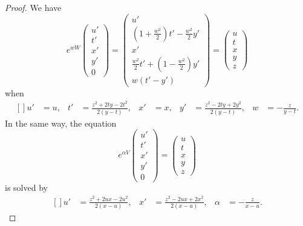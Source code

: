 \begin{proof}
We have
\begin{equation}
	 e^{wW}
\begin{pmatrix}
	u'	\\ 
	t'	\\ 
	x'	\\ 
	y'	\\ 
	0	
\end{pmatrix}=
\begin{pmatrix}
	u'	\\ 
	\left( 1+\frac{ w^2 }{2} \right)t'-\frac{ w^2 }{2}y'	\\ 
	x'	\\ 
	\frac{ w^2 }{2}t'+\left( 1-\frac{ w^2 }{2} \right)y'	\\ 
	w(t'-y')	
\end{pmatrix}
=
\begin{pmatrix}
	u	\\ 
	t	\\ 
	x	\\ 
	y	\\ 
	z	
\end{pmatrix}
\end{equation}
when
\begin{equation}
	\begin{aligned}[]
		u'&=u,& t'&=\frac{ z^2+2ty-2t^2 }{ 2(y-t) },&x'&=x,&y'&=\frac{ z^2-2ty+2y^2 }{ 2(y-t) },&w&=-\frac{ z }{ y-t }.
	\end{aligned}
\end{equation}
In the same way, the equation
\begin{equation}
	 e^{\alpha V}\begin{pmatrix}
	u'	\\ 
	t'	\\ 
	x'	\\ 
	y'	\\ 
	0	
\end{pmatrix}=
	 \begin{pmatrix}
	u	\\ 
	t\\ 
	x	\\ 
	y\\ 
	z	
\end{pmatrix}
\end{equation}
is solved by
\begin{equation}
	\begin{aligned}[]
		u'&=\frac{ z^2+2ux-2u^2 }{ 2(x-u) },&x'&=\frac{ z^2-2ux+2x^2 }{ 2(x-u) },&\alpha&=-\frac{ z }{ x-u }.
	\end{aligned}

\end{equation}
\end{proof}
